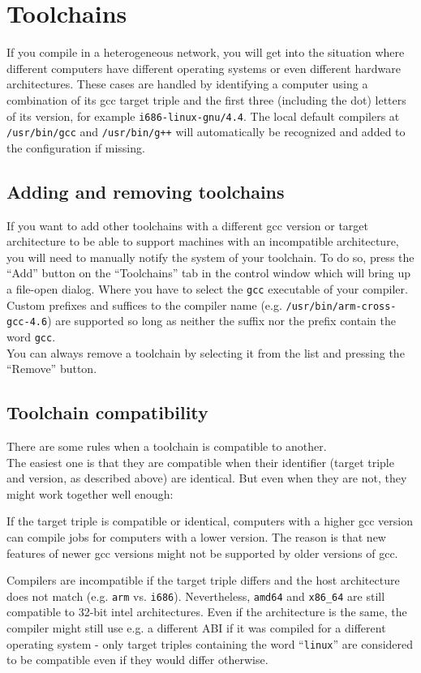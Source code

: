 \documentclass[a4paper,9pt]{scrartcl}
\begin{document}
\section{Toolchains}

If you compile in a heterogeneous network, you will get into the situation where different computers have different operating systems or even different hardware architectures. These cases are handled by identifying a computer using a combination of its gcc target triple and the first three (including the dot) letters of its version, for example \texttt{i686-linux-gnu/4.4}. The local default compilers at \texttt{/usr/bin/gcc} and \texttt{/usr/bin/g++} will automatically be recognized and added to the configuration if missing.

\subsection{Adding and removing toolchains}

If you want to add other toolchains with a different gcc version or target architecture to be able to support machines with an incompatible architecture, you will need to manually notify the system of your toolchain. To do so, press the ``Add'' button on the ``Toolchains'' tab in the control window which will bring up a file-open dialog. Where you have to select the \texttt{gcc} executable of your compiler. Custom prefixes and suffices to the compiler name (e.g. \texttt{/usr/bin/arm-cross-gcc-4.6}) are supported so long as neither the suffix nor the prefix contain the word \texttt{gcc}. \\You can always remove a toolchain by selecting it from the list and pressing the ``Remove'' button.

\subsection{Toolchain compatibility}

There are some rules when a toolchain is compatible to another.\\
The easiest one is that they are compatible when their identifier (target triple and version, as described above) are identical. But even when they are not, they might work together well enough:\\
\smallskip

If the target triple is compatible or identical, computers with a higher gcc version can compile jobs for computers with a lower version. The reason is that new features of newer gcc versions might not be supported by older versions of gcc.\\
\smallskip

Compilers are incompatible if the target triple differs and the host architecture does not match (e.g. \texttt{arm} vs. \texttt{i686}). Nevertheless, \texttt{amd64} and \texttt{x86\_64} are still compatible to 32-bit intel architectures. Even if the architecture is the same, the compiler might still use e.g. a different ABI if it was compiled for a different operating system - only target triples containing the word ``\texttt{linux}'' are considered to be compatible even if they would differ otherwise.
\end{document}
